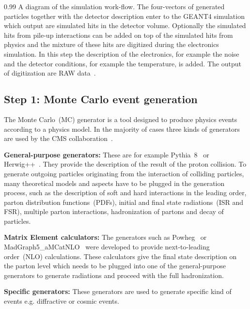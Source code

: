                  {0.99}       %
                 { A diagram of the simulation work-flow. The four-vectors of generated particles together with the detector description enter to the GEANT4 simulation which output are simulated hits in the detector volume. Optionally the simulated hits from pile-up interactions can be added on top of the simulated hits from physics and the mixture of these hits are digitized during the electronics simulation. In this step the description of the electronics, for example the noise and the detector conditions, for example the temperature, is added. The output of digitization are RAW data~\cite{website:simuBasics}. }


\subsection{Step 1: Monte Carlo event generation}

The Monte Carlo~(MC) generator is a tool designed to produce physics events according to a physics model. In the majority of cases three kinds of generators are used by the CMS collaboration~\cite{website:generation, website:generationIntro}. 

\textbf{General-purpose generators: }
These are for example Pythia~8~\cite{Sjostrand:2014zea} or Herwig++~\cite{Bahr:2008pv}. They provide the description of the result of the proton collision. To generate outgoing particles originating from the interaction of colliding particles, many theoretical models and aspects have to be plugged in the generation process, such as the description of soft and hard interactions in the leading order, parton distribution functions~(PDFs), initial and final state radiations~(ISR and FSR), multiple parton interactions, hadronization of partons and decay of particles.

\textbf{Matrix Element calculators: }
The generators such as Powheg~\cite{Oleari:2010nx} or MadGraph5\_aMCatNLO~\cite{Alwall:2014hca} were developed to provide next-to-leading order~(NLO) calculations. These calculators give the final state description on the parton level which needs to be plugged into one of the general-purpose generators to generate radiations and proceed with the full hadronization.

\textbf{Specific generators: }
These generators are used to generate specific kind of events e.g. diffractive or cosmic events.

